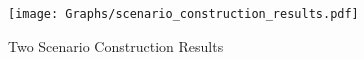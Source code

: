


\begin{figure}[!t]
  \centering
  \texttt{[image: Graphs/scenario\_construction\_results.pdf]}
  \caption{Two Scenario Construction Results}
  \label{fig:scene_con}
\vspace{-6mm}
\end{figure}

